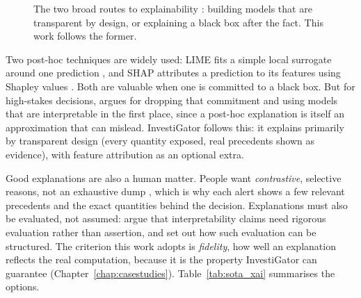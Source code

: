 \begin{figure}[ht]
\centering
{}
\caption[Taxonomy of explainability approaches]{The two broad routes to explainability
\autocite{arrieta2020xai, guidotti2018survey}: building models that are transparent by design, or
explaining a black box after the fact. This work follows the former.}
\label{fig:sota_xai_taxonomy}
\end{figure}

Two post-hoc techniques are widely used: LIME fits a simple local surrogate around one prediction
\autocite{ribeiro2016lime}, and SHAP attributes a prediction to its features using Shapley values
\autocite{lundberg2017shap}. Both are valuable when one is committed to a black box. But for high-stakes
decisions, \textcite{rudin2019stop} argues for dropping that commitment and using models that are
interpretable in the first place, since a post-hoc explanation is itself an approximation that can mislead.
InvestiGator follows this: it explains primarily by transparent design (every quantity exposed, real precedents
shown as evidence), with feature attribution as an optional extra.

Good explanations are also a human matter. People want \emph{contrastive}, selective reasons, not an
exhaustive dump \autocite{miller2019explanation}, which is why each alert shows a few relevant precedents
and the exact quantities behind the decision. Explanations must also be evaluated, not assumed:
\textcite{doshivelez2017rigorous} argue that interpretability claims need rigorous evaluation rather
than assertion, and set out how such evaluation can be structured. The criterion this work adopts is
\emph{fidelity}, how well an explanation reflects the real computation, because it is the property
InvestiGator can guarantee (Chapter~\ref{chap:casestudies}). Table~\ref{tab:sota_xai} summarises the
options.

